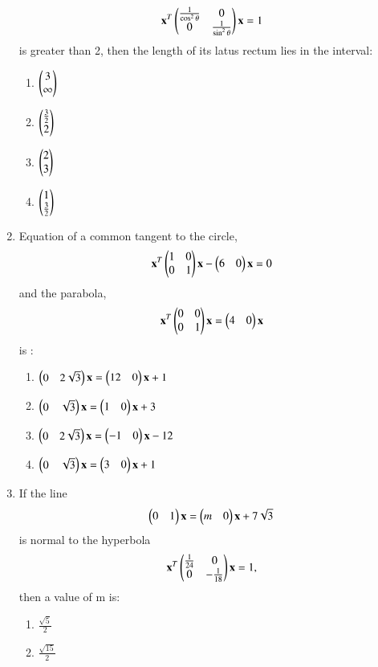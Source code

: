 \begin{enumerate}[label=\arabic*.,ref=\thesubsection.\theenumi]
    \begin{align}
    \mathbf{x}^T\begin{pmatrix}\frac{1}{\cos^2\theta}&0\\0&\frac{1}{\sin^2\theta}\end{pmatrix} \mathbf{x}=1 
    \end{align} is greater than 2, then the length of its latus rectum lies in the interval:
    \begin{enumerate}
    \item $\begin{pmatrix}3\\\infty\end{pmatrix}$
    \item $\begin{pmatrix}\frac{3}{2}\\2\end{pmatrix}$
    \item $\begin{pmatrix}2\\3\end{pmatrix}$
    \item $\begin{pmatrix}1\\\frac{3}{2}\end{pmatrix}$
    \end{enumerate}
    \item Equation of a common tangent to the circle,
    \begin{align}
    \mathbf{x}^T\begin{pmatrix}1&0\\0&1\end{pmatrix}\mathbf{x}-\begin{pmatrix}6&0\end{pmatrix}\mathbf{x}=0
    \end{align} and the parabola,
    \begin{align}
    \mathbf{x}^T\begin{pmatrix}0&0\\0&1\end{pmatrix}\mathbf{x}=\begin{pmatrix}4&0\end{pmatrix}\mathbf{x}
    \end{align} is :
    \begin{enumerate}
    \item $\begin{pmatrix}0&2\sqrt{3}\end{pmatrix}\mathbf{x}=\begin{pmatrix}12&0\end{pmatrix}\mathbf{x}+1$
    \item $\begin{pmatrix}0&\sqrt{3}\end{pmatrix}\mathbf{x}=\begin{pmatrix}1&0\end{pmatrix}\mathbf{x}+3$
    \item $\begin{pmatrix}0&2\sqrt{3}\end{pmatrix}\mathbf{x}=\begin{pmatrix}-1&0\end{pmatrix}\mathbf{x}-12$
    \item $\begin{pmatrix}0&\sqrt{3}\end{pmatrix}\mathbf{x}=\begin{pmatrix}3&0\end{pmatrix}\mathbf{x}+1$
    \end{enumerate}
    \item If the line 
    \begin{align}
    \begin{pmatrix}0&1\end{pmatrix}\mathbf{x}=\begin{pmatrix}m&0\end{pmatrix}\mathbf{x}+7\sqrt{3}
    \end{align} is normal to the hyperbola 
    \begin{align}
    \mathbf{x}^T\begin{pmatrix}\frac{1}{24}&0\\0&-\frac{1}{18}\end{pmatrix}\mathbf{x}=1,
    \end{align} then a value of m is:
    \begin{enumerate}
    \item $\frac{\sqrt{5}}{2}$
    \item $\frac{\sqrt{15}}{2}$

\end{enumerate}
\end{enumerate}
